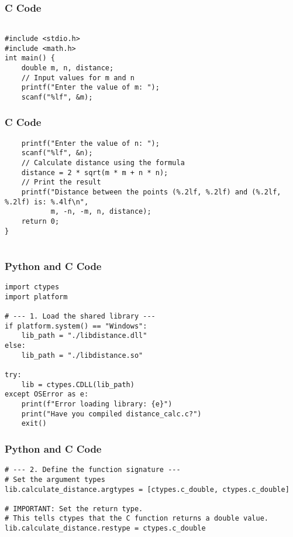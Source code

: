 \documentclass{beamer}
\begin{document}
\begin{frame}[fragile]
\frametitle{C Code}
\begin{lstlisting}
  
#include <stdio.h>
#include <math.h>
int main() {
    double m, n, distance;
    // Input values for m and n
    printf("Enter the value of m: ");
    scanf("%lf", &m);
\end{lstlisting}
\end{frame}

\begin{frame}[fragile]
\frametitle{C Code}
\begin{lstlisting}
    printf("Enter the value of n: ");
    scanf("%lf", &n);
    // Calculate distance using the formula
    distance = 2 * sqrt(m * m + n * n);
    // Print the result
    printf("Distance between the points (%.2lf, %.2lf) and (%.2lf, %.2lf) is: %.4lf\n",
           m, -n, -m, n, distance);
    return 0;
}


\end{lstlisting}

\end{frame}


\begin{frame}[fragile]
\frametitle{Python and C Code}

\begin{lstlisting}
import ctypes
import platform

# --- 1. Load the shared library ---
if platform.system() == "Windows":
    lib_path = "./libdistance.dll"
else:
    lib_path = "./libdistance.so"

try:
    lib = ctypes.CDLL(lib_path)
except OSError as e:
    print(f"Error loading library: {e}")
    print("Have you compiled distance_calc.c?")
    exit()
\end{lstlisting}
\end{frame}

\begin{frame}[fragile]
\frametitle{Python and C Code}

\begin{lstlisting}
# --- 2. Define the function signature ---
# Set the argument types
lib.calculate_distance.argtypes = [ctypes.c_double, ctypes.c_double]

# IMPORTANT: Set the return type.
# This tells ctypes that the C function returns a double value.
lib.calculate_distance.restype = ctypes.c_double
\end{lstlisting}
\end{frame}
\end{document}

